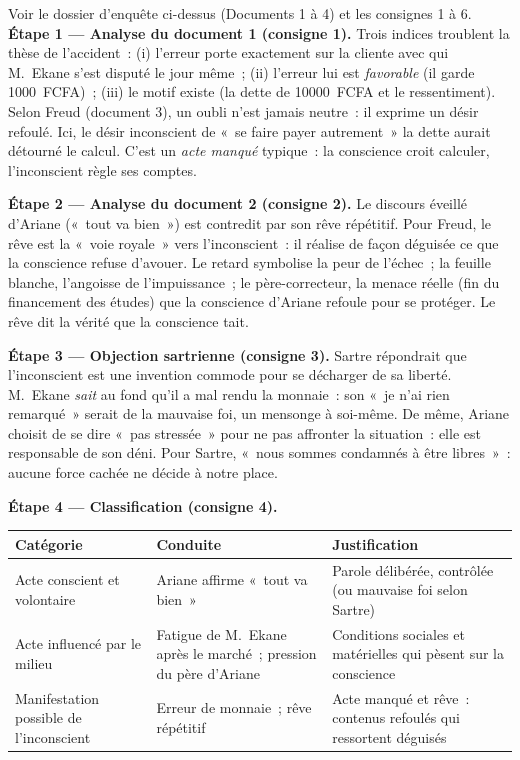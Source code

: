 \documentclass[11pt]{article}
\begin{document}
\begin{exoresolu}
Voir le dossier d'enquête ci-dessus (Documents 1 à 4) et les consignes 1 à 6.
\tcblower
\textbf{Étape 1 — Analyse du document 1 (consigne 1).} Trois indices troublent la thèse de l'accident~: (i) l'erreur porte exactement sur la cliente avec qui M.~Ekane s'est disputé le jour même~; (ii) l'erreur lui est \emph{favorable} (il garde \num{1000}~FCFA)~; (iii) le motif existe (la dette de \num{10000}~FCFA et le ressentiment). Selon Freud (document 3), un oubli n'est jamais neutre~: il exprime un désir refoulé. Ici, le désir inconscient de «~se faire payer autrement~» la dette aurait détourné le calcul. C'est un \emph{acte manqué} typique~: la conscience croit calculer, l'inconscient règle ses comptes.

\textbf{Étape 2 — Analyse du document 2 (consigne 2).} Le discours éveillé d'Ariane («~tout va bien~») est contredit par son rêve répétitif. Pour Freud, le rêve est la «~voie royale~» vers l'inconscient~: il réalise de façon déguisée ce que la conscience refuse d'avouer. Le retard symbolise la peur de l'échec~; la feuille blanche, l'angoisse de l'impuissance~; le père-correcteur, la menace réelle (fin du financement des études) que la conscience d'Ariane refoule pour se protéger. Le rêve dit la vérité que la conscience tait.

\textbf{Étape 3 — Objection sartrienne (consigne 3).} Sartre répondrait que l'inconscient est une invention commode pour se décharger de sa liberté. M.~Ekane \emph{sait} au fond qu'il a mal rendu la monnaie~: son «~je n'ai rien remarqué~» serait de la mauvaise foi, un mensonge à soi-même. De même, Ariane choisit de se dire «~pas stressée~» pour ne pas affronter la situation~: elle est responsable de son déni. Pour Sartre, «~nous sommes condamnés à être libres~»~: aucune force cachée ne décide à notre place.

\textbf{Étape 4 — Classification (consigne 4).}
\begin{center}
\begin{tabularx}{\linewidth}{|l|X|X|}\hline
\rowcolor{popblueL} \textbf{Catégorie} & \textbf{Conduite} & \textbf{Justification} \\ \hline
Acte conscient et volontaire & Ariane affirme «~tout va bien~» & Parole délibérée, contrôlée (ou mauvaise foi selon Sartre) \\ \hline
Acte influencé par le milieu & Fatigue de M.~Ekane après le marché~; pression du père d'Ariane & Conditions sociales et matérielles qui pèsent sur la conscience \\ \hline
Manifestation possible de l'inconscient & Erreur de monnaie~; rêve répétitif & Acte manqué et rêve~: contenus refoulés qui ressortent déguisés \\ \hline
\end{tabularx}
\end{center}


\end{exoresolu}
\end{document}
